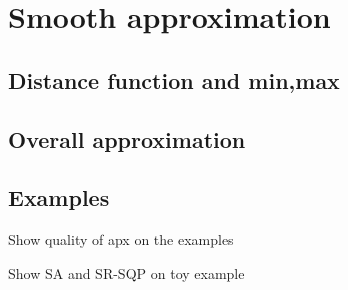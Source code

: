 \section{Smooth approximation}
\label{sec:smooth apx}


\subsection{Distance function and min,max}

\subsection{Overall approximation}

\subsection{Examples}

Show quality of apx on the examples

Show SA and SR-SQP on toy example